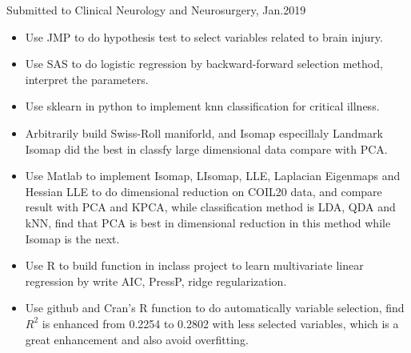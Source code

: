 \documentclass{resume}
\begin{document}
Submitted to Clinical Neurology and Neurosurgery, Jan.2019
\begin{itemize}
   \item Use JMP to do hypothesis test to select variables related to brain injury.
  \item Use SAS to do logistic regression by backward-forward selection method, interpret the parameters.
  \item Use sklearn in python to implement knn classification for critical illness.
\end{itemize}

\begin{itemize}
  \item Arbitrarily build Swiss-Roll maniforld, and Isomap especillaly Landmark Isomap did the best in classfy large dimensional data compare with PCA.
  \item Use Matlab to implement Isomap, LIsomap, LLE, Laplacian Eigenmaps and Hessian LLE to do dimensional reduction on COIL20 data, and compare result with PCA and KPCA, while classification method is LDA, QDA and kNN, find that PCA is best in dimensional reduction in this method while Isomap is the next.  
  
\end{itemize}

\begin{itemize}
  \item Use R to build function in inclass project to learn multivariate linear regression by write AIC, PressP, ridge  regularization. 
  \item Use github and Cran's R function to do automatically variable selection, find $R^{2}$ is enhanced from 0.2254 to 0.2802 with less selected variables, which is a great enhancement and also avoid overfitting.
\end{itemize}



%
%
\end{document}
